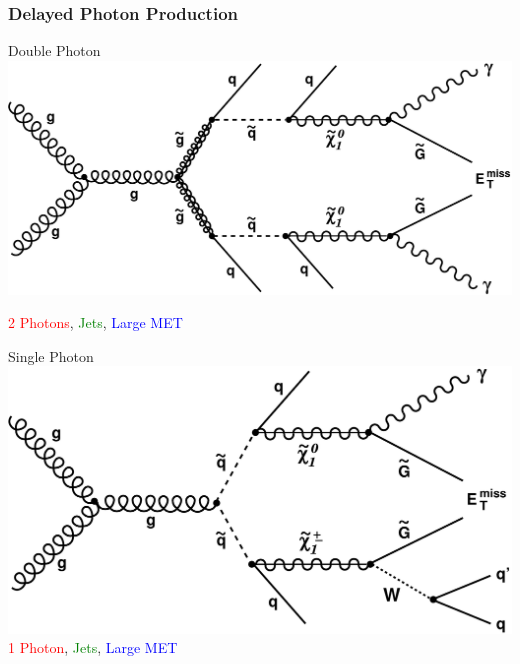 \documentclass{beamer}
\begin{document}
\begin{frame}
\frametitle{\Huge{Delayed Photon Production}}  
  \fboxsep=0pt  
  \begin{varblock}[7cm]{Double Photon}
   \centering
    \includegraphics[width=0.50\linewidth]{THESISPLOTS/Diphoton_gluino.pdf}
       
     \large{ \textcolor{red}{2 Photons}, \textcolor{green}{Jets}, \textcolor{blue}{Large MET} }   
     \end{varblock}%
     \vspace{-0.3cm}
     \begin{varblock}[7cm]{Single Photon}
    \centering
       \includegraphics[width=0.50\linewidth]{THESISPLOTS/SinglePhoton_squark.pdf}
       \newline
       \large{ \textcolor{red}{1 Photon}, \textcolor{green}{Jets}, \textcolor{blue}{Large MET} }
    \end{varblock}
\end{frame}
\end{document}
